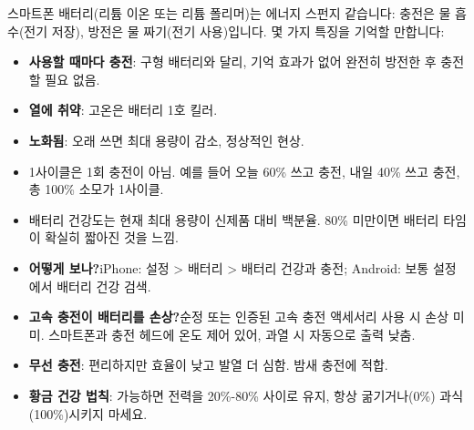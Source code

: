


스마트폰 배터리(리튬 이온 또는 리튬 폴리머)는 에너지 스펀지 같습니다: 충전은 물 흡수(전기 저장), 방전은 물 짜기(전기 사용)입니다. 몇 가지 특징을 기억할 만합니다:

\begin{itemize}
  \item \textbf{사용할 때마다 충전}: 구형 배터리와 달리, 기억 효과가 없어 완전히 방전한 후 충전할 필요 없음.
  \item \textbf{열에 취약}: 고온은 배터리 1호 킬러.
  \item \textbf{노화됨}: 오래 쓰면 최대 용량이 감소, 정상적인 현상.
\end{itemize}


\begin{itemize}
  \item 1사이클은 1회 충전이 아님. 예를 들어 오늘 60\% 쓰고 충전, 내일 40\% 쓰고 충전, 총 100\% 소모가 1사이클.
  \item 배터리 건강도는 현재 최대 용량이 신제품 대비 백분율. 80\% 미만이면 배터리 타임이 확실히 짧아진 것을 느낌.
  \item \textbf{어떻게 보나?}iPhone: 설정 > 배터리 > 배터리 건강과 충전; Android: 보통 설정에서 배터리 건강 검색.
\end{itemize}


\begin{itemize}
  \item \textbf{고속 충전이 배터리를 손상?}순정 또는 인증된 고속 충전 액세서리 사용 시 손상 미미. 스마트폰과 충전 헤드에 온도 제어 있어, 과열 시 자동으로 출력 낮춤.
  \item \textbf{무선 충전}: 편리하지만 효율이 낮고 발열 더 심함. 밤새 충전에 적합.
  \item \textbf{황금 건강 법칙}: 가능하면 전력을 20\%-80\% 사이로 유지, 항상 굶기거나(0\%) 과식(100\%)시키지 마세요.
\end{itemize}


